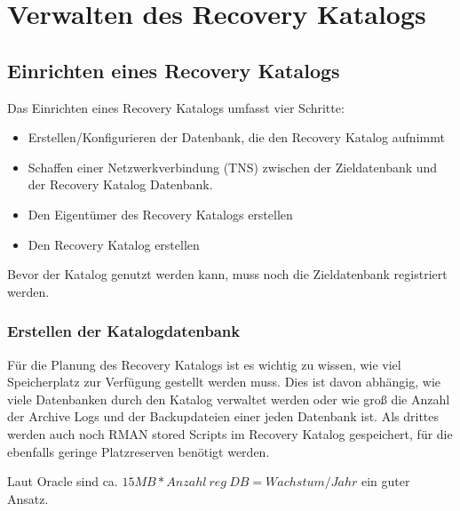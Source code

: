   \chapter{Verwalten des Recovery Katalogs}
    \setcounter{page}{1}
    \minitoc
\newpage
    \section{Einrichten eines Recovery Katalogs}
    \label{createrecoverycatalog}
      Das Einrichten eines Recovery Katalogs umfasst vier Schritte:
      \begin{itemize}
        \item Erstellen/Konfigurieren der Datenbank, die den Recovery Katalog aufnimmt
        \item Schaffen einer Netzwerkverbindung (TNS) zwischen der Zieldatenbank und der Recovery Katalog Datenbank.
        \item Den Eigent\"umer des Recovery Katalogs erstellen
        \item Den Recovery Katalog erstellen
      \end{itemize}
      Bevor der Katalog genutzt werden kann, muss noch die Zieldatenbank registriert werden.
      \subsection{Erstellen der Katalogdatenbank}
        F\"ur die Planung des Recovery Katalogs ist es wichtig zu wissen, wie viel Speicherplatz zur Verf\"ugung gestellt werden muss. Dies ist davon abh\"angig, wie viele Datenbanken durch den Katalog verwaltet werden oder wie gro\ss{} die Anzahl der Archive Logs und der Backupdateien einer jeden Datenbank ist. Als drittes werden auch noch RMAN stored Scripts im Recovery Katalog gespeichert, f\"ur die ebenfalls geringe Platzreserven ben\"otigt werden.

        \begin{merke}
          Laut Oracle sind ca. $15 MB * Anzahl\ reg\ DB = Wachstum/Jahr$ ein guter Ansatz.
        \end{merke}

